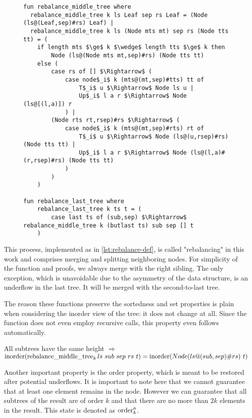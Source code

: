 
\begin{figure}
\begin{lstlisting}[mathescape=true, language=Isabelle,label={lst:rebalance-def},
    caption={The rebalancing functions}]
fun rebalance_middle_tree where
  rebalance_middle_tree k ls Leaf sep rs Leaf = (Node (ls@(Leaf,sep)#rs) Leaf) |
  rebalance_middle_tree k ls (Node mts mt) sep rs (Node tts tt) = (
    if length mts $\ge$ k $\wedge$ length tts $\ge$ k then
        Node (ls@(Node mts mt,sep)#rs) (Node tts tt)
    else (
        case rs of [] $\Rightarrow$ (
            case node$_i$ k (mts@(mt,sep)#tts) tt of
                T$_i$ u $\Rightarrow$ Node ls u |
                Up$_i$ l a r $\Rightarrow$ Node (ls@[(l,a)]) r
            ) |
        (Node rts rt,rsep)#rs $\Rightarrow$ (
            case node$_i$ k (mts@(mt,sep)#rts) rt of
                T$_i$ u $\Rightarrow$ Node (ls@(u,rsep)#rs) (Node tts tt) |
                Up$_i$ l a r $\Rightarrow$ Node (ls@(l,a)#(r,rsep)#rs) (Node tts tt)
            )
        )
    )

fun rebalance_last_tree where
    rebalance_last_tree k ts t = (
        case last ts of (sub,sep) $\Rightarrow$ rebalance_middle_tree k (butlast ts) sub sep [] t
    )
\end{lstlisting}
\end{figure}

This process, implemented as in \autoref{lst:rebalance-def},
is called "rebalancing" in this work and comprises
merging and splitting neighboring nodes.
For simplicity of the function and proofs, we always
merge with the right sibling.
The only exception, which is unavoidable due to the asymmetry of the data structure,
is an underflow in the last tree.
It will be merged with the second-to-last tree.

The reason these functions preserve the sortedness and set properties
is plain when considering the inorder view of the tree:
it does not change at all.
Since the function does not even employ recursive calls,
this property even follows automatically.

\begin{lemma}
    \label{lem:rebalance-inorder}
    All subtrees have the same height $\Longrightarrow$ \\
    $\operatorname{inorder} (\operatorname{rebalance\_middle\_tree}_k ls\ sub\ sep\ rs\ t) = \operatorname{inorder} (Node (ls@(sub,sep)\#rs)\ t)$
\end{lemma}

Another important property is the order property,
which is meant to be restored after potential underflows.
It is important to note here that we cannot guarantee
that at least one element remains in the node.
However we can guarantee that all subtrees of the result are of order $k$
and that there are no more than $2k$ elements in the result.
This state is denoted as $\operatorname{order}^a_k$.

